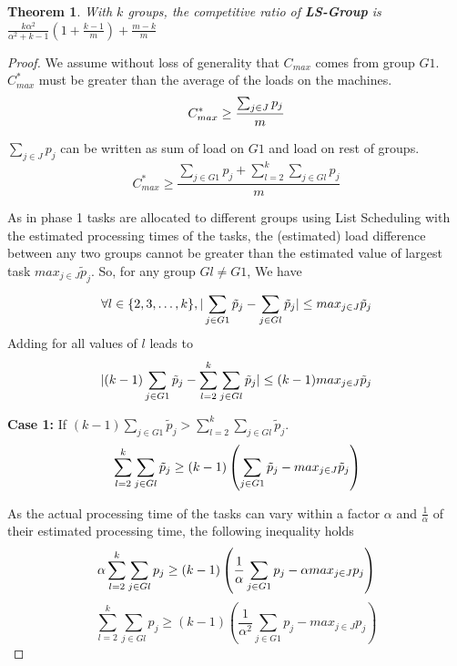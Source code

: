 \documentclass[10pt, conference, compsocconf]{IEEEtran}
\newtheorem{theorem}{Theorem}
\begin{document}
\begin{theorem}
  \label{th:strategy3}
  With $k$ groups, the competitive ratio of
  \textbf{LS-Group } is $ \frac{k\alpha^{2}}{\alpha^{2}+k-1} (1+
  {\frac{k-1}{m}} ) + \frac{m-k}{m}$
\end{theorem}
\begin{proof} 
  We assume without loss of generality that $ C_{max}$ comes from
  group $G1$. $C_{max}^{*}$ must be greater than the average of the
  loads on the machines.
  \begin{equation}{\nonumber}
    C_{max}^{*} \geq  \frac{\sum_{j \in J}^{}{{p_{j}}}}{m}
  \end{equation}

  $\sum_{j \in J }{{p_{j}}}$ can be written as sum of load on $G1$ and
  load on rest of groups.
  \begin{equation}\label{eq11}
    C_{max}^{*} \geq  \frac{\sum_{j \in G1 }^{}{{p_{j}}}+ \sum_{l=2}^{k}\sum_{j \in Gl }^{}{{p_{j}}}}{m}
  \end{equation}

  As in phase 1 tasks are allocated to different groups using List
  Scheduling with the estimated processing times of the tasks, the
  (estimated) load difference between any two groups cannot be greater
  than the estimated value of largest task ${max_{j \in J}}{\tilde
    p_{j}}$.  So, for any group $Gl \neq G1$, We have
  \begin{equation}{\nonumber}
\forall l \in \{2, 3, \dots ,k\}, |\sum_{j \in G1 }^{}{\tilde p_{j}}- \sum_{j \in Gl }^{}{\tilde p_{j}}| \leq {max_{j \in J}}{\tilde p_{j}}
  \end{equation}  
  Adding for all values of $l$ leads to
  \begin{equation}{\nonumber}
    |(k-1)\sum_{j \in G1 }^{}{\tilde p_{j}}- \sum_{l=2}^{k}\sum_{j \in Gl }^{}{\tilde p_{j}}| \leq (k-1) {max_{j \in J}}{\tilde p_{j}}
  \end{equation}

  \textbf{Case 1:} If $(k-1)\sum_{j \in G1 }^{}{\tilde p_{j}} >
  \sum_{l=2}^{k}\sum_{j \in Gl }^{}{\tilde p_{j}}$.
  \begin{equation}{\nonumber}
    \sum_{l=2}^{k}\sum_{j \in Gl }^{}{\tilde p_{j}} \geq (k-1) \left( \sum_{j \in G1 }^{}{\tilde p_{j}}- {max_{j \in J}}{\tilde p_{j}} \right)
  \end{equation}

  As the actual processing time of the tasks can vary within a factor
  $\alpha$ and $\frac{1}{\alpha}$ of their estimated processing time,
  the following inequality holds
  \begin{equation}{\nonumber}
    \alpha\sum_{l=2}^{k}\sum_{j \in Gl }^{}{{p_{j}}} \geq (k-1) \left( \frac{1}{\alpha}\sum_{j \in G1 }^{}{{p_{j}}}- \alpha {max_{j \in J}}{{p_{j}}} \right)
  \end{equation}
  \begin{equation}\label{eq9}
    \sum_{l=2}^{k}\sum_{j \in Gl }^{}{{p_{j}}} \geq (k-1) \left(\frac{1}{\alpha^{2}}\sum_{j \in G1 }^{}{{p_{j}}}-  {max_{j \in J}}{{p_{j}}} \right)
  \end{equation}


\end{proof}
\end{document}

